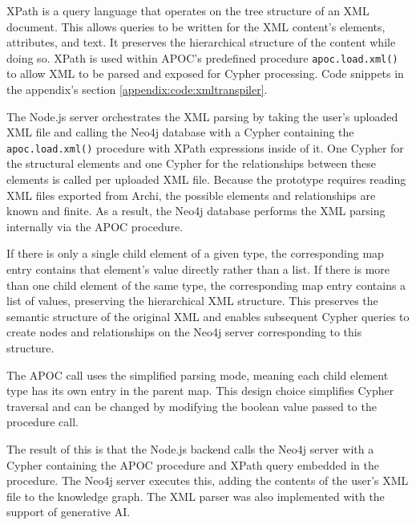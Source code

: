 XPath is a query language that operates on the tree structure of an XML document. This allows queries to be written for the XML content's elements, attributes, and text. It preserves the hierarchical structure of the content while doing so. \cite{clark1999xml} XPath is used within APOC's predefined procedure \texttt{apoc.load.xml()} to allow XML to be parsed and exposed for Cypher processing. \cite{neo4j_apoc_load_xml} Code snippets in the appendix's section \ref{appendix:code:xmltranspiler}.

The Node.js server orchestrates the XML parsing by taking the user's uploaded XML file and calling the Neo4j database with a Cypher containing the \texttt{apoc.load.xml()} procedure with XPath expressions inside of it. One Cypher for the structural elements and one Cypher for the relationships between these elements is called per uploaded XML file. Because the prototype requires reading XML files exported from Archi, the possible elements and relationships are known and finite. As a result, the Neo4j database performs the XML parsing internally via the APOC procedure.

If there is only a single child element of a given type, the corresponding map entry contains that element’s value directly rather than a list. If there is more than one child element of the same type, the corresponding map entry contains a list of values, preserving the hierarchical XML structure. \cite{neo4j_apoc_load_xml} This preserves the semantic structure of the original XML and enables subsequent Cypher queries to create nodes and relationships on the Neo4j server corresponding to this structure. 

The APOC call uses the simplified parsing mode, meaning each child element type has its own entry in the parent map. This design choice simplifies Cypher traversal and can be changed by modifying the boolean value passed to the procedure call. \cite{neo4j_apoc_load_xml}

The result of this is that the Node.js backend calls the Neo4j server with a Cypher containing the APOC procedure and XPath query embedded in the procedure. The Neo4j server executes this, adding the contents of the user's XML file to the knowledge graph. The XML parser was also implemented with the support of generative AI.

